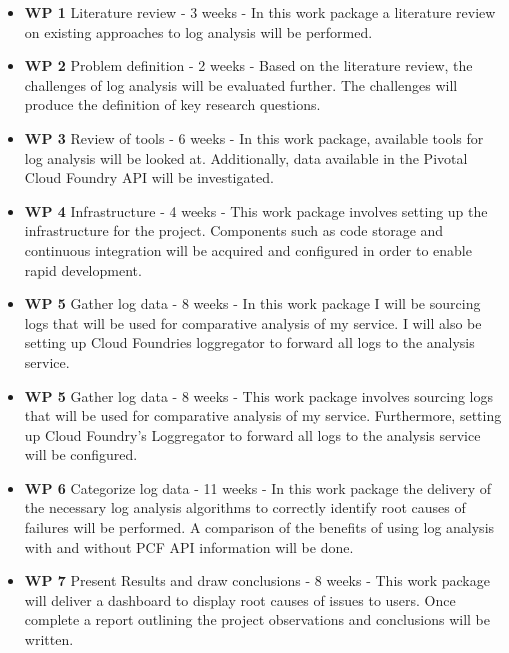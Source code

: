 \begin{itemize}
  \item \textbf{WP 1} Literature review - 3 weeks - In this work package a literature review on existing approaches to log analysis will be performed.
  
  \item \textbf{WP 2} Problem definition - 2 weeks - Based on the literature review, the challenges of log analysis will be evaluated further. The challenges will produce the definition of key research questions.
  
  \item \textbf{WP 3} Review of tools - 6 weeks - In this work package, available tools for log analysis will be looked at. Additionally, data available in the Pivotal Cloud Foundry API will be investigated.
  
\item \textbf{WP 4} Infrastructure - 4 weeks - This work package involves setting up the infrastructure for the project. Components such as code storage and continuous integration will be acquired and configured in order to enable rapid development. 
  
  \item \textbf{WP 5} Gather log data - 8 weeks - In this work package I will be sourcing logs that will be used for comparative analysis of my service. I will also be setting up Cloud Foundries loggregator to forward all logs to the analysis service.
  
  \item \textbf{WP 5} Gather log data - 8 weeks - This work package involves sourcing logs that will be used for comparative analysis of my service. Furthermore, setting up Cloud Foundry's Loggregator to forward all logs to the analysis service will be configured.
  
  \item \textbf{WP 6} Categorize log data - 11 weeks - In this work package the delivery of the necessary log analysis algorithms to correctly identify root causes of failures will be performed. A comparison of the benefits of using log analysis with and without PCF API information will be done.
    
  \item \textbf{WP 7} Present Results and draw conclusions - 8 weeks - This work package will deliver a dashboard to display root causes of issues to users. Once complete a report outlining the project observations and conclusions will be written.
\end{itemize}

